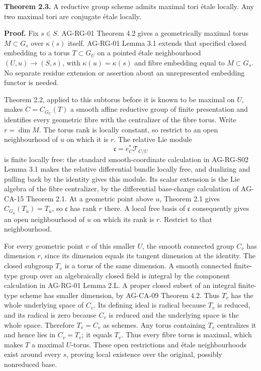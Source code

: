 \documentclass[11pt,a4paper,openany]{report}
\begin{document}
\textbf{Theorem 2.3.} A reductive group scheme admits maximal tori étale locally. Any two maximal tori are conjugate étale locally.

\textbf{Proof.} Fix \(s\in S\). AG-RG-01 Theorem 4.2 gives a geometrically maximal torus \(M\subset G_s\) over \(\kappa(s)\) itself. AG-RG-01 Lemma 3.1 extends that specified closed embedding to a torus \(T\subset G_U\) on a pointed étale neighbourhood \((U,u)\to(S,s)\), with \(\kappa(u)=\kappa(s)\) and fibre embedding equal to \(M\subset G_s\). No separate residue extension or assertion about an unrepresented embedding functor is needed.

Theorem 2.2, applied to this subtorus before it is known to be maximal on \(U\), makes \(C=C_{G_U}(T)\) a smooth affine reductive group of finite presentation and identifies every geometric fibre with the centralizer of the fibre torus. Write \(r=\dim M\). The torus rank is locally constant, so restrict to an open neighbourhood of \(u\) on which it is \(r\). The relative Lie module \[
 \mathfrak c=e_C^*\mathcal T_{C/U}
\] is finite locally free: the standard smooth-coordinate calculation in AG-RG-S02 Lemma 3.1 makes the relative differential bundle locally free, and dualizing and pulling back by the identity gives this module. Its scalar extension is the Lie algebra of the fibre centralizer, by the differential base-change calculation of AG-CA-15 Theorem 2.1. At a geometric point above \(u\), Theorem 2.1 gives \(C_{G_{\bar u}}(T_{\bar u})=T_{\bar u}\), so \(\mathfrak c\) has rank \(r\) there. A local free basis of \(\mathfrak c\) consequently gives an open neighbourhood of \(u\) on which its rank is \(r\). Restrict to that neighbourhood.

For every geometric point \(v\) of this smaller \(U\), the smooth connected group \(C_v\) has dimension \(r\), since its dimension equals its tangent dimension at the identity. The closed subgroup \(T_v\) is a torus of the same dimension. A smooth connected finite-type group over an algebraically closed field is integral by the component calculation in AG-RG-01 Lemma 2.L. A proper closed subset of an integral finite-type scheme has smaller dimension, by AG-CA-09 Theorem 4.2. Thus \(T_v\) has the whole underlying space of \(C_v\). Its defining ideal is radical because \(T_v\) is reduced, and its radical is zero because \(C_v\) is reduced and the underlying space is the whole space. Therefore \(T_v=C_v\) as schemes. Any torus containing \(T_v\) centralizes it and hence lies in \(C_v=T_v\); it equals \(T_v\). Thus every fibre torus is maximal, which makes \(T\) a maximal \(U\)-torus. These open restrictions and étale neighbourhoods exist around every \(s\), proving local existence over the original, possibly nonreduced base.
\end{document}
